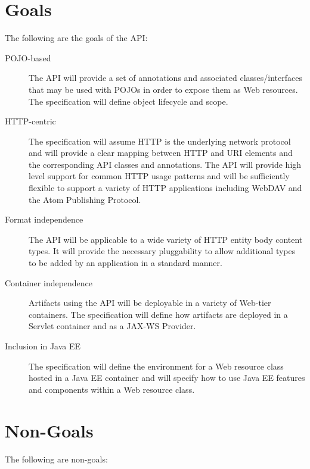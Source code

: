 \section{Goals}

The following are the goals of the API:

\begin{description}

\item[POJO-based] The API will provide a set of annotations and associated classes/interfaces that may be used with POJOs in order to expose them as Web resources. The specification will define object lifecycle and scope.

\item[HTTP-centric] The specification will assume HTTP\cite{http11} is the underlying network protocol and will provide a clear mapping between HTTP and URI\cite{uri} elements and the corresponding API classes and annotations. The API will provide high level support for common HTTP usage patterns and will be sufficiently flexible to support a variety of HTTP applications including WebDAV\cite{webdav} and the Atom Publishing Protocol\cite{atompub}.

\item[Format independence] The API will be applicable to a wide variety of HTTP entity body content types. It will provide the necessary pluggability to allow additional types to be added by an application in a standard manner.

\item[Container independence] Artifacts using the API will be deployable in a variety of Web-tier containers. The specification will define how artifacts are deployed in a Servlet\cite{servlet} container and as a JAX-WS\cite{jsr224} Provider.

\item[Inclusion in Java EE] The specification will define the environment for a Web resource class hosted in a Java EE container and will specify how to use Java EE features and components within a Web resource class.

\end{description}

\section{Non-Goals}

The following are non-goals:

